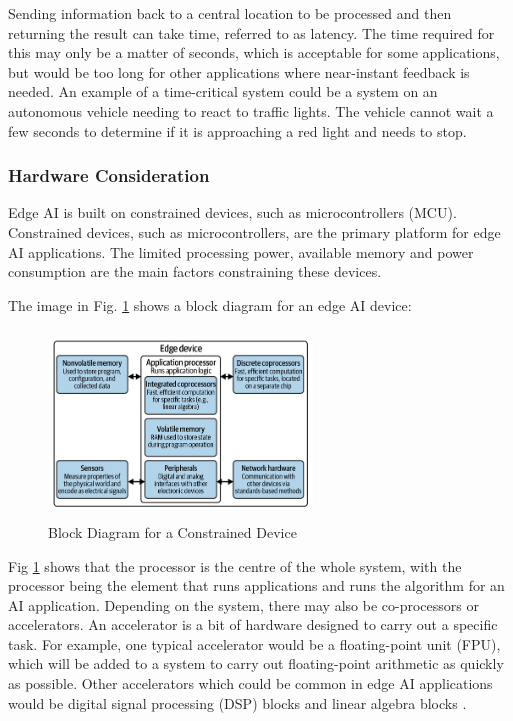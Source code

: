 \documentclass[conference]{IEEEtran}
\begin{document}
Sending information back to a central location to be processed and then returning the result can take time, referred to as latency. The time required for this may only be a matter of seconds, which is acceptable for some applications, but would be too long for other applications where near-instant feedback is needed. An example of a time-critical system could be a system on an autonomous vehicle needing to react to traffic lights. The vehicle cannot wait a few seconds to determine if it is approaching a red light and needs to stop. 

\subsubsection{Hardware Consideration}
Edge AI is built on constrained devices, such as microcontrollers (MCU). Constrained devices, such as microcontrollers, are the primary platform for edge AI applications. The limited processing power, available memory and power consumption are the main factors constraining these devices. 

The image in Fig. \ref{fig:ucblock} shows a block diagram for an edge AI device:    
\begin{figure}[h]
\includegraphics[width=7cm, height=5cm]{images/system_block_diagram.png}
\centering
\caption{Block Diagram for a Constrained Device}
\label{fig:ucblock}
\end{figure}

Fig \ref{fig:ucblock} shows that the processor is the centre of the whole system, with the processor being the element that runs applications and runs the algorithm for an AI application. Depending on the system, there may also be co-processors or accelerators. An accelerator is a bit of hardware designed to carry out a specific task. For example, one typical accelerator would be a floating-point unit (FPU), which will be added to a system to carry out floating-point arithmetic as quickly as possible. Other accelerators which could be common in edge AI applications would be digital signal processing (DSP) blocks and linear algebra blocks \cite{edgeAI}. 
\end{document}
